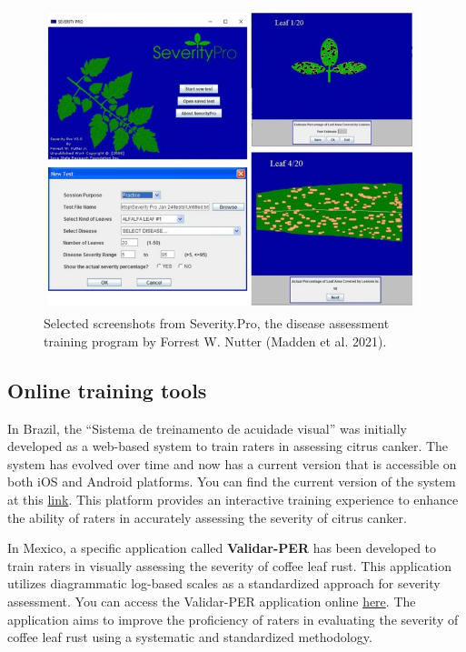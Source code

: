 \documentclass[
  letterpaper,
  DIV=11,
  numbers=noendperiod]{scrreprt}
\begin{document}
\begin{figure}

{\centering \includegraphics[width=4.28125in,height=\textheight]{imgs/severitypro.png}

}

\caption{\label{fig-severitypro}Selected screenshots from Severity.Pro,
the disease assessment training program by Forrest W. Nutter (Madden et
al. 2021).}

\end{figure}

\hypertarget{online-training-tools}{%
\subsection{Online training tools}\label{online-training-tools}}

In Brazil, the ``Sistema de treinamento de acuidade visual'' was
initially developed as a web-based system to train raters in assessing
citrus canker. The system has evolved over time and now has a current
version that is accessible on both iOS and Android platforms. You can
find the current version of the system at this
\href{http://sitav.pga.uem.br/index.php?menu=app}{link}. This platform
provides an interactive training experience to enhance the ability of
raters in accurately assessing the severity of citrus canker.

In Mexico, a specific application called \textbf{Validar-PER} has been
developed to train raters in visually assessing the severity of coffee
leaf rust. This application utilizes diagrammatic log-based scales as a
standardized approach for severity assessment. You can access the
Validar-PER application online
\href{http://royacafe.lanref.org.mx/ValidarPer/app/index.php}{here}. The
application aims to improve the proficiency of raters in evaluating the
severity of coffee leaf rust using a systematic and standardized
methodology.
\end{document}

